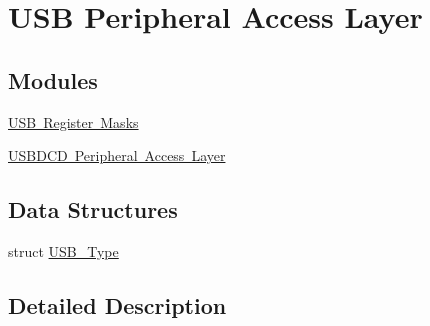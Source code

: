 \hypertarget{group___u_s_b___peripheral___access___layer}{}\section{U\+SB Peripheral Access Layer}
\label{group___u_s_b___peripheral___access___layer}
\subsection*{Modules}
\begin{DoxyCompactItemize}
\item 
\mbox{\hyperlink{group___u_s_b___register___masks}{U\+S\+B Register Masks}}
\item 
\mbox{\hyperlink{group___u_s_b_d_c_d___peripheral___access___layer}{U\+S\+B\+D\+C\+D Peripheral Access Layer}}
\end{DoxyCompactItemize}
\subsection*{Data Structures}
\begin{DoxyCompactItemize}
\item 
struct \mbox{\hyperlink{struct_u_s_b___type}{U\+S\+B\+\_\+\+Type}}
\end{DoxyCompactItemize}


\subsection{Detailed Description}
